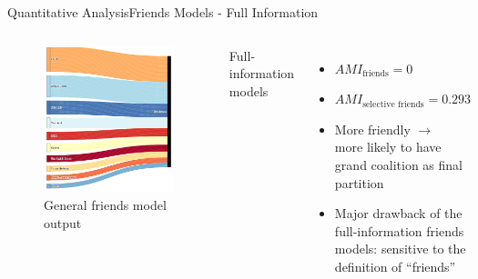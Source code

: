 \documentclass[xcolor=dvipsnames]{beamer}
\newcommand{\AMI}{\mathit{AMI}}
\begin{document}
\begin{frame}{Quantitative Analysis}{Friends Models - Full Information}
  \small
  \begin{columns}
  \begin{figure}
    \includegraphics[width=\linewidth]{friends}
    \caption{General friends model output}
  \end{figure}
  Full-information models
  \begin{itemize}
    \item $\AMI_{\text{friends}} = 0$
    \item $\AMI_{\text{selective friends}} = 0.293$
    \item More friendly $\rightarrow$ more likely to have grand coalition as final partition
    \item Major drawback of the full-information friends models: sensitive to the definition of ``friends''
  \end{itemize}
  \end{columns}
\end{frame}
\end{document}
